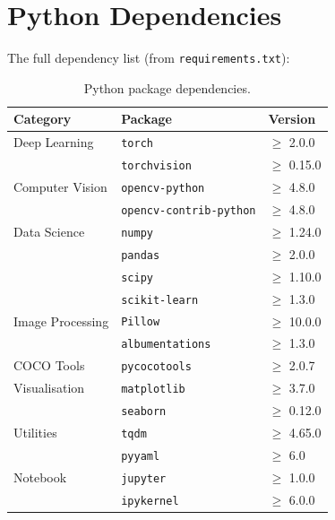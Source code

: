 \documentclass[12pt, a4paper, twoside]{report}
\begin{document}
\section{Python Dependencies}
The full dependency list (from \texttt{requirements.txt}):

\begin{table}[H]
\centering
\caption{Python package dependencies.}
\begin{tabular}{lll}
\toprule
\textbf{Category} & \textbf{Package} & \textbf{Version} \\
\midrule
Deep Learning   & \texttt{torch}                & $\geq$ 2.0.0 \\
                & \texttt{torchvision}          & $\geq$ 0.15.0 \\
\midrule
Computer Vision & \texttt{opencv-python}        & $\geq$ 4.8.0 \\
                & \texttt{opencv-contrib-python} & $\geq$ 4.8.0 \\
\midrule
Data Science    & \texttt{numpy}                & $\geq$ 1.24.0 \\
                & \texttt{pandas}               & $\geq$ 2.0.0 \\
                & \texttt{scipy}                & $\geq$ 1.10.0 \\
                & \texttt{scikit-learn}          & $\geq$ 1.3.0 \\
\midrule
Image Processing & \texttt{Pillow}              & $\geq$ 10.0.0 \\
                 & \texttt{albumentations}       & $\geq$ 1.3.0 \\
\midrule
COCO Tools      & \texttt{pycocotools}          & $\geq$ 2.0.7 \\
\midrule
Visualisation   & \texttt{matplotlib}           & $\geq$ 3.7.0 \\
                & \texttt{seaborn}              & $\geq$ 0.12.0 \\
\midrule
Utilities       & \texttt{tqdm}                 & $\geq$ 4.65.0 \\
                & \texttt{pyyaml}               & $\geq$ 6.0 \\
\midrule
Notebook        & \texttt{jupyter}              & $\geq$ 1.0.0 \\
                & \texttt{ipykernel}            & $\geq$ 6.0.0 \\
\bottomrule
\end{tabular}
\end{table}
\end{document}
